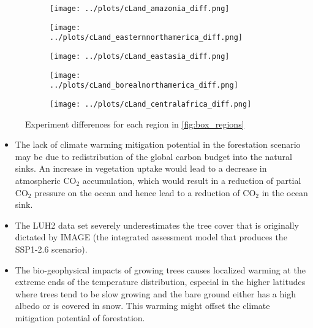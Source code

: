 \documentclass[]{article}
\begin{document}
\begin{figure}[H]
    \centering
    \begin{subfigure}[b]{0.4\linewidth}
        \texttt{[image: ../plots/cLand\_amazonia\_diff.png]}
    \end{subfigure}

    \begin{subfigure}[b]{0.4\linewidth}
        \texttt{[image: ../plots/cLand\_easternnorthamerica\_diff.png]}
    \end{subfigure}
    \begin{subfigure}[b]{0.4\linewidth}
        \texttt{[image: ../plots/cLand\_eastasia\_diff.png]}
    \end{subfigure}
    \begin{subfigure}[b]{0.4\linewidth}
        \texttt{[image: ../plots/cLand\_borealnorthamerica\_diff.png]}
    \end{subfigure}
    \begin{subfigure}[b]{0.4\linewidth}
        \texttt{[image: ../plots/cLand\_centralafrica\_diff.png]}
    \end{subfigure}
    \caption{Experiment differences for each region in \ref{fig:box_regions}}
    \label{fig:aus_region_cveg_tas}
\end{figure}

\begin{itemize}
    \item The lack of climate warming mitigation potential in the forestation scenario may be due to redistribution of the global carbon budget into the natural sinks.
        An increase in vegetation uptake would lead to a decrease in atmospheric CO$_2$ accumulation, which would result in a reduction of partial CO$_2$ pressure on the ocean and hence lead to a reduction of CO$_2$ in the ocean sink.
    \item The LUH2 data set severely underestimates the tree cover that is originally dictated by IMAGE (the integrated assessment model that produces the SSP1-2.6 scenario).
    \item The bio-geophysical impacts of growing trees causes localized warming at the extreme ends of the temperature distribution, especial in the higher latitudes where trees tend to be slow growing and the bare ground either has a high albedo or is covered in snow. This warming might offset the climate mitigation potential of forestation.
\end{itemize}
\end{document}
